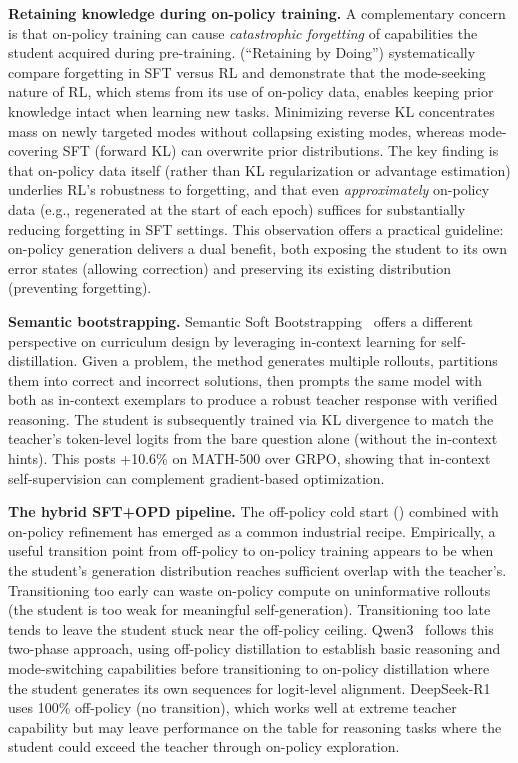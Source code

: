 \documentclass{article} %
\begin{document}
\textbf{Retaining knowledge during on-policy training.} A complementary concern is that on-policy training can cause \emph{catastrophic forgetting} of capabilities the student acquired during pre-training. \citet{2510.18874} (``Retaining by Doing'') systematically compare forgetting in SFT versus RL and demonstrate that the mode-seeking nature of RL, which stems from its use of on-policy data, enables keeping prior knowledge intact when learning new tasks. Minimizing reverse KL concentrates mass on newly targeted modes without collapsing existing modes, whereas mode-covering SFT (forward KL) can overwrite prior distributions. The key finding is that on-policy data itself (rather than KL regularization or advantage estimation) underlies RL's robustness to forgetting, and that even \emph{approximately} on-policy data (e.g., regenerated at the start of each epoch) suffices for substantially reducing forgetting in SFT settings. This observation offers a practical guideline: on-policy generation delivers a dual benefit, both exposing the student to its own error states (allowing correction) and preserving its existing distribution (preventing forgetting).

\textbf{Semantic bootstrapping.} Semantic Soft Bootstrapping~\citep{mitra2025semantic} offers a different perspective on curriculum design by leveraging in-context learning for self-distillation. Given a problem, the method generates multiple rollouts, partitions them into correct and incorrect solutions, then prompts the same model with both as in-context exemplars to produce a robust teacher response with verified reasoning. The student is subsequently trained via KL divergence to match the teacher's token-level logits from the bare question alone (without the in-context hints). This posts +10.6\% on MATH-500 over GRPO, showing that in-context self-supervision can complement gradient-based optimization.

\textbf{The hybrid SFT+OPD pipeline.} The off-policy cold start (\citet{li2026rethinking}) combined with on-policy refinement has emerged as a common industrial recipe. Empirically, a useful transition point from off-policy to on-policy training appears to be when the student's generation distribution reaches sufficient overlap with the teacher's. Transitioning too early can waste on-policy compute on uninformative rollouts (the student is too weak for meaningful self-generation). Transitioning too late tends to leave the student stuck near the off-policy ceiling. Qwen3~\citep{2505.09388} follows this two-phase approach, using off-policy distillation to establish basic reasoning and mode-switching capabilities before transitioning to on-policy distillation where the student generates its own sequences for logit-level alignment. DeepSeek-R1~\citep{2501.12948} uses 100\% off-policy (no transition), which works well at extreme teacher capability but may leave performance on the table for reasoning tasks where the student could exceed the teacher through on-policy exploration.
\end{document}

